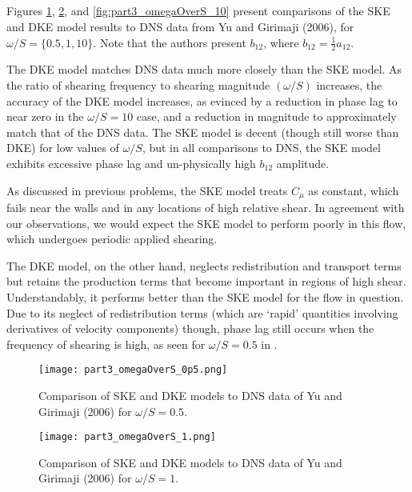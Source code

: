 \documentclass[11pt]{article}
\begin{document}
\subsection{}

Figures \ref{fig:part3_omegaOverS_0p5}, \ref{fig:part3_omegaOverS_1}, and  \ref{fig:part3_omegaOverS_10} present comparisons of the SKE and DKE model results to DNS data from Yu and Girimaji (2006), for $\omega/S = \{0.5,1,10\}$. Note that the authors present $b_{12}$, where $b_{12} = \tfrac{1}{2} a_{12}$.

The DKE model matches DNS data much more closely than the SKE model. As the ratio of shearing frequency to shearing magnitude $(\omega/S)$ increases, the accuracy of the DKE model increases, as evinced by a reduction in phase lag to near zero in the $\omega/S=10$ case, and a reduction in magnitude to approximately match that of the DNS data. The SKE model is decent (though still worse than DKE) for low values of $\omega/S$, but in all comparisons to DNS, the SKE model exhibits excessive phase lag and un-physically high $b_{12}$ amplitude.

As discussed in previous problems, the SKE model treats $C_\mu$ as constant, which fails near the walls and in any locations of high relative shear. In agreement with our observations, we would expect the SKE model to perform poorly in this flow, which undergoes periodic applied shearing.

The DKE model, on the other hand, neglects redistribution and transport terms but retains the production terms that become important in regions of high shear. Understandably, it performs better than the SKE model for the flow in question. Due to its neglect of redistribution terms (which are `rapid' quantities involving derivatives of velocity components) though, phase lag still occurs when the frequency of shearing is high, as seen for $\omega/S = 0.5$ in .

\begin{figure}[p]
\centering
\texttt{[image: part3\_omegaOverS\_0p5.png]}
\vspace{6pt}
\caption{Comparison of SKE and DKE models to DNS data of Yu and Girimaji (2006) for $\omega/S=0.5$.}
\label{fig:part3_omegaOverS_0p5}
\end{figure}

\begin{figure}[p]
\centering
\texttt{[image: part3\_omegaOverS\_1.png]}
\vspace{6pt}
\caption{Comparison of SKE and DKE models to DNS data of Yu and Girimaji (2006) for $\omega/S=1$.}
\label{fig:part3_omegaOverS_1}
\end{figure}
\end{document}
